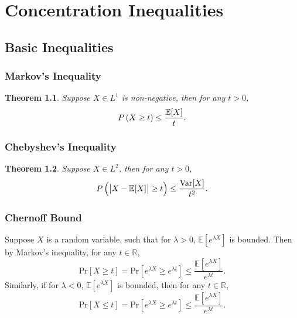 \documentclass[openany]{book}
\newtheorem{theorem}{Theorem}[chapter]
\theoremstyle{definition}
\theoremstyle{remark}
\begin{document}
\part{Concentration Inequalities}
\chapter{Basic Inequalities}
\section{Markov's Inequality}
\begin{theorem}
    Suppose $X\in L^1$ is non-negative, then for any $t>0$,
    \begin{equation*}
        P\del{X\ge t}\le \frac{\mathbb{E}[X]}{t}.
    \end{equation*}
\end{theorem}

\section{Chebyshev's Inequality}
\begin{theorem}
    Suppose $X\in L^2$, then for any $t>0$,
    \begin{equation*}
        P\del{\left|X-\mathbb{E}[X]\right|\ge t}\le \frac{\mathrm{Var}[X]}{t^2}.
    \end{equation*}
\end{theorem}

\section{Chernoff Bound}\label{sec:Chernoff}
Suppose $X$ is a random variable, such that for $\lambda>0$, $\mathbb{E}\left[e^{\lambda X}\right]$ is bounded. Then by Markov's inequality, for any $t\in \mathbb{R}$,
\begin{equation}\label{eq:MarkovCherPos}
    \mathrm{Pr}[X\ge t]=\mathrm{Pr}\left[e^{\lambda X}\ge e^{\lambda t}\right]\le \frac{\mathbb{E}\left[e^{\lambda X}\right]}{e^{\lambda t}}.
\end{equation}
Similarly, if for $\lambda<0$, $\mathbb{E}[e^{\lambda X}]$ is bounded, then for any $t\in \mathbb{R}$,
\begin{equation}\label{eq:MarkovCherNeg}
    \mathrm{Pr}[X\le t]=\mathrm{Pr}\left[e^{\lambda X}\ge e^{\lambda t}\right]\le \frac{\mathbb{E}\left[e^{\lambda X}\right]}{e^{\lambda t}}.
\end{equation}
\end{document}
